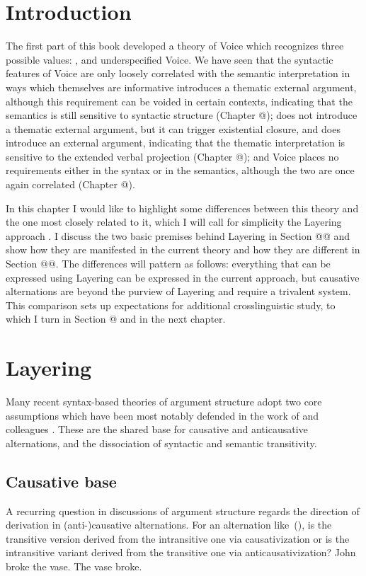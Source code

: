 \section{Introduction} \label{sec:intro}
The first part of this book developed a theory of Voice which recognizes three possible values: {\vd}, {\vz} and underspecified Voice. We have seen that the syntactic features of Voice are only loosely correlated with the semantic interpretation in ways which themselves are informative {\vd} introduces a thematic external argument, although this requirement can be voided in certain contexts, indicating that the semantics is still sensitive to syntactic structure (Chapter @); {\vz} does not introduce a thematic external argument, but it can trigger existential closure, and {\pz} does introduce an external argument, indicating that the thematic interpretation is sensitive to the extended verbal projection (Chapter @); and Voice places no requirements either in the syntax or in the semantics, although the two are once again correlated (Chapter @).

In this chapter I would like to highlight some differences between this theory and the one most closely related to it, which I will call for simplicity the Layering approach \citep{schaefer08,layering15}. I discuss the two basic premises behind Layering in Section @@ and show how they are manifested in the current theory and how they are different in Section @@. The differences will pattern as follows: everything that can be expressed using Layering can be expressed in the current approach, but causative alternations are beyond the purview of Layering and require a trivalent system. This comparison sets up expectations for additional crosslinguistic study, to which I turn in Section @ and in the next chapter.


\section{Layering}
Many recent syntax-based theories of argument structure adopt two core assumptions which have been most notably defended in the work of \cite{schaefer08} and colleagues \citep{alexiadouetal06,layering15}. These are the shared base for causative and anticausative alternations, and the dissociation of syntactic and semantic transitivity.

	\subsection{Causative base}
A recurring question in discussions of argument structure regards the direction of derivation in (anti-)causative alternations. For an alternation like~(\nextx), is the transitive version derived from the intransitive one via causativization or is the intransitive variant derived from the transitive one via anticausativization?
\pex
	\a John broke the vase.
	\a The vase broke.
\xe

